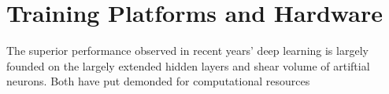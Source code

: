 \section{Training Platforms and Hardware}
The superior performance observed in recent years' deep learning is largely founded on the largely extended hidden layers and shear volume of artiftial neurons. Both have put demonded for computational resources 